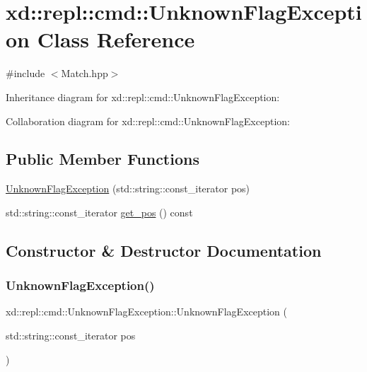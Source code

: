 \hypertarget{classxd_1_1repl_1_1cmd_1_1_unknown_flag_exception}{}\section{xd\+:\+:repl\+:\+:cmd\+:\+:Unknown\+Flag\+Exception Class Reference}
\label{classxd_1_1repl_1_1cmd_1_1_unknown_flag_exception}


{\ttfamily \#include $<$Match.\+hpp$>$}



Inheritance diagram for xd\+:\+:repl\+:\+:cmd\+:\+:Unknown\+Flag\+Exception\+:


Collaboration diagram for xd\+:\+:repl\+:\+:cmd\+:\+:Unknown\+Flag\+Exception\+:
\subsection*{Public Member Functions}
\begin{DoxyCompactItemize}
\item 
\mbox{\hyperlink{classxd_1_1repl_1_1cmd_1_1_unknown_flag_exception_af9c28f0ed576af082fd8e2347dfb8a96}{Unknown\+Flag\+Exception}} (std\+::string\+::const\+\_\+iterator pos)
\item 
std\+::string\+::const\+\_\+iterator \mbox{\hyperlink{classxd_1_1repl_1_1cmd_1_1_unknown_flag_exception_a40721fcc2c9e1af8c0557572a295d980}{get\+\_\+pos}} () const
\end{DoxyCompactItemize}


\subsection{Constructor \& Destructor Documentation}
\mbox{\label{classxd_1_1repl_1_1cmd_1_1_unknown_flag_exception_af9c28f0ed576af082fd8e2347dfb8a96}} 
\subsubsection{\texorpdfstring{Unknown\+Flag\+Exception()}{UnknownFlagException()}}
{\footnotesize\ttfamily xd\+::repl\+::cmd\+::\+Unknown\+Flag\+Exception\+::\+Unknown\+Flag\+Exception (\begin{DoxyParamCaption}\item[{std\+::string\+::const\+\_\+iterator}]{pos }\end{DoxyParamCaption})\hspace{0.3cm}{\ttfamily [inline]}}



